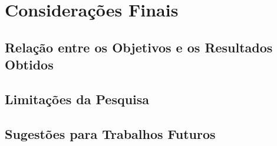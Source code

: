 
\chapter{Considerações Finais}

\section{Relação entre os Objetivos e os Resultados Obtidos}

\section{Limitações da Pesquisa}

\section{Sugestões para Trabalhos Futuros}
